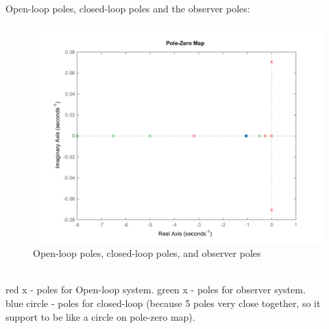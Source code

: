 \documentclass[14pt,a4paper]{article}
\begin{document}
	Open-loop poles, closed-loop poles and the observer poles: 
		\begin{figure}[htp]
			\begin{center}
				\includegraphics[scale = 0.7]{PolesPlot.png}
				\caption{Open-loop poles, closed-loop poles, and observer poles}
			\end{center}
		\end{figure} \\
	red x - poles for Open-loop system. green x - poles for observer system. \\
	blue circle - poles for closed-loop (because 5 poles very close together, so it support to be like a circle on pole-zero map).	
	\pagebreak
	
\end{document}
